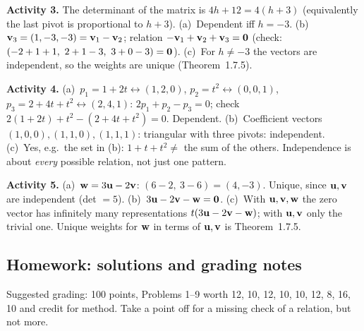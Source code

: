 \documentclass[11pt]{article}
\begin{document}
\begin{sol}
\textbf{Activity 3.} The determinant of the matrix is $4h+12=4(h+3)$ (equivalently the last pivot is proportional to $h+3$). (a)~Dependent iff $h=-3$. (b)~$\mathbf{v}_3=(1,-3,-3)=\mathbf{v}_1-\mathbf{v}_2$; relation $-\mathbf{v}_1+\mathbf{v}_2+\mathbf{v}_3=\mathbf{0}$ (check: $(-2+1+1,\ 2+1-3,\ 3+0-3)=\mathbf{0}$). (c)~For $h\neq-3$ the vectors are independent, so the weights are unique (Theorem~1.7.5).

\textbf{Activity 4.} (a)~$p_1=1+2t\leftrightarrow(1,2,0)$, $p_2=t^2\leftrightarrow(0,0,1)$, $p_3=2+4t+t^2\leftrightarrow(2,4,1)$: $2p_1+p_2-p_3=0$; check $2(1+2t)+t^2-(2+4t+t^2)=0$. Dependent. (b)~Coefficient vectors $(1,0,0),(1,1,0),(1,1,1)$: triangular with three pivots: independent. (c)~Yes, e.g.\ the set in (b): $1+t+t^2\neq$ the sum of the others. Independence is about \emph{every} possible relation, not just one pattern.

\textbf{Activity 5.} (a)~$\mathbf{w}=3\mathbf{u}-2\mathbf{v}$: $(6-2,\ 3-6)=(4,-3)$. Unique, since $\mathbf{u},\mathbf{v}$ are independent (det $=5$). (b)~$3\mathbf{u}-2\mathbf{v}-\mathbf{w}=\mathbf{0}$. (c)~With $\mathbf{u},\mathbf{v},\mathbf{w}$ the zero vector has infinitely many representations $t(3\mathbf{u}-2\mathbf{v}-\mathbf{w})$; with $\mathbf{u},\mathbf{v}$ only the trivial one. Unique weights for $\mathbf{w}$ in terms of $\mathbf{u},\mathbf{v}$ is Theorem~1.7.5.
\end{sol}

\subsection*{Homework: solutions and grading notes}
Suggested grading: 100 points, Problems 1--9 worth 12, 10, 12, 10, 10, 12, 8, 16, 10 and credit for method. Take a point off for a missing check of a relation, but not more.
\end{document}
